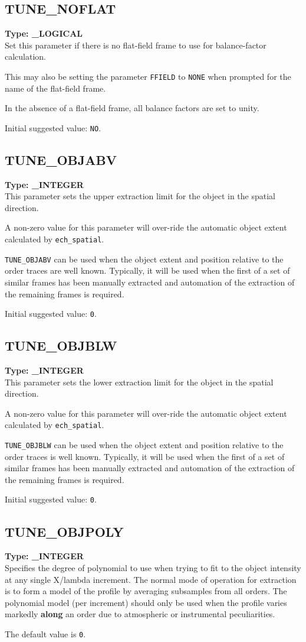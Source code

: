 \documentclass[11pt,twoside]{article}
\makeatletter
\newcommand{\htmlref}[2]{#1}
\newcommand{\xlabel}[1]{}
\newcommand{\sunspec}[2]{#1}
\renewcommand{\sunspec}[2]{#2}
\newcommand{\indexcmdname}[1]{\index{#1@\protect\cmdname{#1}}}
\renewcommand{\indexcmdname}[1]{}
\newcommand{\cmdname}{\begingroup \catcode`\_=12 \realcmdname}
\newcommand{\realcmdname}[1]{\endgroup\texttt{#1}}
\newcommand{\echparameter}[4]
{
\item [#1 = #3] \mbox{}\label{par_#2}\indexcmdname{#2}
\\
#4
}
\renewcommand{\echparameter}[4]
{
  \subsection{\xlabel{par_#2}\label{par_#2}{\bf #1}}
  {\bf Type: #3}\\
#4
}
\makeatother
\begin{document}
\echparameter{TUNE\_NOFLAT}{TUNE_NOFLAT}{
 \_LOGICAL
}{
 Set this parameter if there is no flat-field frame to use for
 balance-factor calculation.

 This may also be setting the parameter \htmlref{\texttt{FFIELD}}{par_FFIELD}
 to \texttt{NONE} when prompted for the name of the flat-field frame.

 In the absence of a flat-field frame, all balance factors are set to
 unity.

 Initial suggested value: \texttt{NO}.
}

\echparameter{TUNE\_OBJABV}{TUNE_OBJABV}{
 \_INTEGER
}{
 This parameter sets the upper extraction limit for the object
 in the spatial direction.

 A non-zero value for this parameter will over-ride the
 automatic object extent calculated by
 \htmlref{{\tt ech\_spatial}}{ech_spatial}.

 {\tt TUNE\_OBJABV} can be used when the object extent and position
 relative to the order traces are well known.   Typically, it will
 be used when the first of a set of similar frames has been manually
 extracted and automation of the extraction of the remaining
 frames is required.

 Initial suggested value: \texttt{0}.
}

\echparameter{TUNE\_OBJBLW}{TUNE_OBJBLW}{
 \_INTEGER
}{
 This parameter sets the lower extraction limit for the object
 in the spatial direction.

 A non-zero value for this parameter will over-ride the automatic
 object extent calculated by \htmlref{{\tt ech\_spatial}}{ech_spatial}.

 {\tt TUNE\_OBJBLW} can be used when the object extent and position
 relative to
 the order traces is well known.  Typically, it will be used
 when the first of a set of similar frames has been manually
 extracted and automation of the extraction of the remaining
 frames is required.

 Initial suggested value: \texttt{0}.
}

\echparameter{TUNE\_OBJPOLY}{TUNE_OBJPOLY}{
 \_INTEGER
}{
 Specifies the degree of polynomial to use when trying to fit to the
 object intensity at any single \sunspec{$X/\lambda$}{X/lambda}
 increment.  The normal mode
 of operation for extraction is to form a model of the profile by
 averaging subsamples from all orders.  The polynomial model (per
 increment) should only be used when the profile varies markedly
 {\bf along} an order due to atmospheric or instrumental peculiarities.

 The default value is \texttt{0}.
}
\end{document}
